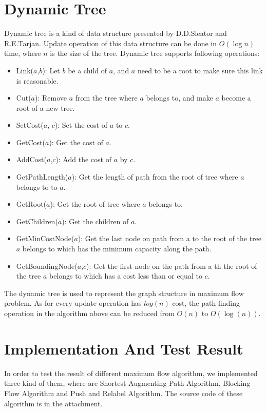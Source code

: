 \documentclass[twocolumn,9pt]{extarticle}
\begin{document}
\section{Dynamic Tree}
Dynamic tree is a kind of data structure presented by D.D.Sleator and R.E.Tarjan. Update operation of this data structure can be done in $O(\log{n})$ time, where $n$ is the size of the tree. Dynamic tree supports following operations:
\begin{itemize}
\item Link($a$,$b$): Let $b$ be a child of $a$, and $a$ need to be a root to make sure this link is reasonable.
\item Cut($a$): Remove $a$ from the tree where $a$ belongs to, and make $a$ become a root of a new tree.
\item SetCost($a$, $c$): Set the cost of $a$ to $c$.
\item GetCost($a$): Get the cost of $a$.
\item AddCost($a$,$c$): Add the cost of $a$ by $c$.
\item GetPathLength($a$): Get the length of path from the root of tree where $a$ belongs to to $a$.
\item GetRoot($a$): Get the root of tree where $a$ belongs to.
\item GetChildren($a$): Get the children of $a$.
\item GetMinCostNode($a$): Get the last node on path from a to the root of the tree $a$ belongs to which has the minimum capacity along the path.
\item GetBoundingNode($a$,$c$): Get the first node on the path from a th the root of the tree $a$ belongs to which has a cost less than or equal to $c$.
\end{itemize}
The dynamic tree is used to represent the graph structure in maximum flow problem. As for every update operation has $log(n)$ cost, the path finding operation in the algorithm above can be reduced from $O(n)$ to $O(\log(n))$.


\section{Implementation And Test Result}
In order to test the result of different maximum flow algorithm, we implemented three kind of them, where are Shortest Augmenting Path Algorithm, Blocking Flow Algorithm and Push and Relabel Algorithm. The source code of these algorithm is in the attachment.
\end{document}
